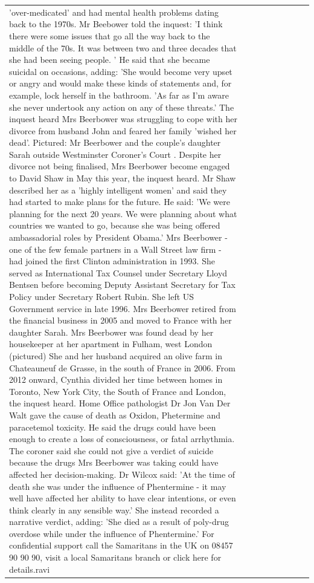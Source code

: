 \begin{table}[H]
\begin{tabular}{lllrlllll}
'over-medicated' and had mental health problems dating back to the 1970s. Mr Beebower told the inquest: 'I think there were some issues that go all the way back to the middle of the 70s. It was between two and three decades that she had been seeing people. ' He said that she became suicidal on occasions, adding: 'She would become very upset or angry and would make these kinds of statements and, for example, lock herself in the bathroom. 'As far as I'm aware she never undertook any action on any of these threats.' The inquest heard Mrs Beerbower was struggling to cope with her divorce from husband John and feared her family 'wished her dead'. Pictured: Mr Beerbower and the couple's daughter Sarah outside Westminster Coroner's Court . Despite her divorce not being finalised, Mrs Beerbower become engaged to David Shaw in May this year, the inquest heard. Mr Shaw described her as a 'highly intelligent women' and said they had started to make plans for the future. He said: 'We were planning for the next 20 years. We were planning about what countries we wanted to go, because she was being offered ambassadorial roles by President Obama.' Mrs Beerbower - one of the few female partners in a Wall Street law firm - had joined the first Clinton administration in 1993. She served as International Tax Counsel under Secretary Lloyd Bentsen before becoming Deputy Assistant Secretary for Tax Policy under Secretary Robert Rubin. She left US Government service in late 1996. Mrs Beerbower retired from the financial business in 2005 and moved to France with her daughter Sarah. Mrs Beerbower was found dead by her housekeeper at her apartment in Fulham, west London (pictured) She and her husband acquired an olive farm in Chateauneuf de Grasse, in the south of France in 2006. From 2012 onward, Cynthia divided her time between homes in Toronto, New York City, the South of France and London, the inquest heard. Home Office pathologist Dr Jon Van Der Walt gave the cause of death as Oxidon, Phetermine and paracetemol toxicity. He said the drugs could have been enough to create a loss of consciousness, or fatal arrhythmia. The coroner said she could not give a verdict of suicide because the drugs Mrs Beerbower was taking could have affected her decision-making. Dr Wilcox said: 'At the time of death she was under the influence of Phentermine - it may well have affected her ability to have clear intentions, or even think clearly in any sensible way.' She instead recorded a narrative verdict, adding: 'She died as a result of poly-drug overdose while under the influence of Phentermine.' For confidential support call the Samaritans in the UK on 08457 90 90 90, visit a local Samaritans branch or click here for details.ravi \\

\end{tabular}
\end{table}
